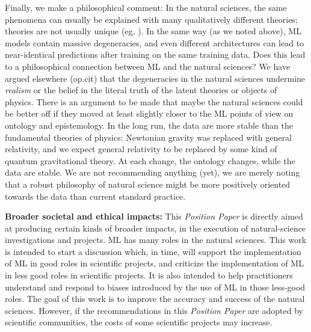 \documentclass{article}
\newcommand{\documentname}{\textsl{Position Paper}}
\renewcommand{\paragraph}[1]{\noindent\par\textbf{#1}}
\begin{document}
Finally, we make a philosophical comment:
In the natural sciences, the same phenomena can usually be explained with many qualitatively different theories; theories are not usually unique (eg, \citealt{hogg, peebles}).
In the same way (as we noted above), ML models contain massive degeneracies, and even different architectures can lead to near-identical predictions after training on the same training data.
Does this lead to a philosophical connection between ML and the natural sciences?
We have argued elsewhere (op.cit) that the degeneracies in the natural sciences undermine \emph{realism} or the belief in the literal truth of the latent theories or objects of physics.
There is an argument to be made that maybe the natural sciences could be better off if they moved at least slightly closer to the ML points of view on ontology and epistemology.
In the long run, the data are more stable than the fundamental theories of physics:
Newtonian gravity was replaced with general relativity, and we expect general relativity to be replaced by some kind of quantum gravitational theory.
At each change, the ontology changes, while the data are stable.
We are not recommending anything (yet), we are merely noting that a robust philosophy of natural science might be more positively oriented towards the data than current standard practice.

\paragraph{Broader societal and ethical impacts:}
This \documentname{} is directly aimed at producing certain kinds of broader impacts, in the execution of natural-science investigations and projects.
ML has many roles in the natural sciences.
This work is intended to start a discussion which, in time, will support the implementation of ML in good roles in scientific projects, and criticize the implementation of ML in less good roles in scientific projects.
It is also intended to help practitioners understand and respond to biases introduced by the use of ML in those less-good roles.
The goal of this work is to improve the accuracy and success of the natural sciences.
However, if the recommendations in this \documentname{} are adopted by scientific communities, the costs of some scientific projects may increase.
\end{document}
